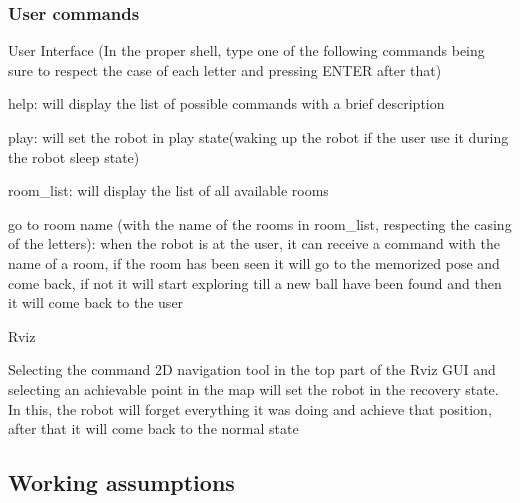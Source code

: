 \subsubsection*{User commands}


\begin{DoxyItemize}
\item User Interface (In the proper shell, type one of the following commands being sure to respect the case of each letter and pressing E\+N\+T\+ER after that)
\begin{DoxyItemize}
\item help\+: will display the list of possible commands with a brief description
\item play\+: will set the robot in play state(waking up the robot if the user use it during the robot sleep state)
\item room\+\_\+list\+: will display the list of all available rooms
\item go to \textquotesingle{}room name\textquotesingle{} (with the name of the rooms in room\+\_\+list, respecting the casing of the letters)\+: when the robot is at the user, it can receive a command with the name of a room, if the room has been seen it will go to the memorized pose and come back, if not it will start exploring till a new ball have been found and then it will come back to the user
\end{DoxyItemize}
\item Rviz
\begin{DoxyItemize}
\item Selecting the command 2D navigation tool in the top part of the Rviz G\+UI and selecting an achievable point in the map will set the robot in the recovery state. In this, the robot will forget everything it was doing and achieve that position, after that it will come back to the normal state
\end{DoxyItemize}
\end{DoxyItemize}

\subsection*{Working assumptions}

